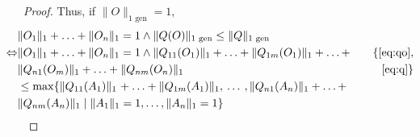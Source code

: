 \begin{proof}
Thus, if  $\lVert O \rVert_{1 \text{ gen}} = 1$,
\begin{align*}
  \hspace{-30pt}&  \lVert O_1  \rVert_1  + \ldots + \lVert O_n  \rVert_1 = 1  \wedge \lVert Q(O) \rVert_{1 \text{ gen}} \leq  \lVert Q \rVert_{1 \text{ gen}} \\
  \hspace{-30pt} \Leftrightarrow  & \lVert O_1  \rVert_1  + \ldots + \lVert O_n  \rVert_1 = 1  \wedge  \lVert Q_{11} (O_{1}) \rVert_{1} + \ldots +  \lVert Q_{1m} (O_{1}) \rVert_{1} + \ldots +  \hspace{10pt}&   \{\text{\autoref{eq:qo}}, \\
  \hspace{-30pt} & \lVert Q_{n1} (O_{m}) \rVert_{1} +  \ldots  + \lVert Q_{nm} (O_{n}) \rVert_{1}   & \text{\autoref{eq:q}} \} \\
  \hspace{-30pt}& \leq \max \{ \lVert Q_{11} (A_{1}) \rVert_{1} \hspace{1pt} + \ldots +  \lVert Q_{1m} (A_{1}) \rVert_{1}, \hspace{2pt} \ldots \hspace{2pt},  \lVert Q_{n1} (A_{n}) \rVert_{1} + \ldots +   \\
  \hspace{-30pt}&\lVert Q_{nm} (A_{n}) \rVert_{1}  \mid  \lVert A_{1} \rVert_{1} = 1, \ldots, \lVert A_{n} \rVert_{1} = 1 \} \\

\end{align*}
\end{proof}
